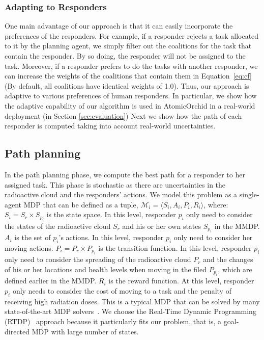 \subsubsection{Adapting to Responders}
One main advantage of our approach is that it can easily
incorporate the preferences of the responders. For example, if a
responder rejects  a task allocated to it by the planning agent, we
simply filter out the coalitions for the task that contain the
responder. By so doing, the responder will not be assigned to the
task. Moreover, if a responder prefers to do the tasks with another
responder, we can increase the weights of the coalitions that
contain them in Equation~\ref{eq:cf} (By default, all coalitions
have identical weights of 1.0). Thus, our approach is adaptive to
various preferences of human responders. In particular, we show how
the adaptive capability of our algorithm is used in AtomicOrchid in
a real-world deployment (in Section \ref{sec:evaluation}) Next we
show how the path of each responder is computed taking into account
real-world uncertainties.

\subsection{Path planning}
\label{sec:pathplanning}

\noindent In the path planning phase, we compute the best path for
a responder to her assigned task. This phase is stochastic as there
are uncertainties in the radioactive cloud and the responders'
actions. We model this problem as a single-agent MDP that can be
defined as a tuple, $\mathcal{M}_i = \langle S_i, A_i, P_i, R_i
\rangle$, where: $S_i = S_r \times S_{p_i}$ is the state space. In
this level, responder $p_i$ only need to consider the states of the
radioactive cloud $S_r$ and his or her own states $S_{p_i}$ in the
MMDP. $A_i$ is the set of $p_i$'s actions. In this level, responder
$p_i$ only need to consider her moving actions. $P_i = P_r \times
P_{p_i}$ is the transition function. In this level, responder $p_i$
only need to consider the spreading of the radioactive cloud $P_r$
and the changes of his or her locations and health levels when
moving in the filed $P_{p_i}$, which are defined earlier in the
MMDP. $R_i$ is the reward function. At this level, responder $p_i$
only needs to consider the cost of moving to a task and the penalty
of receiving high radiation doses. This is a typical MDP that can
be solved by many state-of-the-art MDP solvers~\cite{?}. We choose
the Real-Time Dynamic Programming (RTDP)~\cite{?} approach because
it particularly fits  our problem, that is, a goal-directed MDP
with large number of states.

